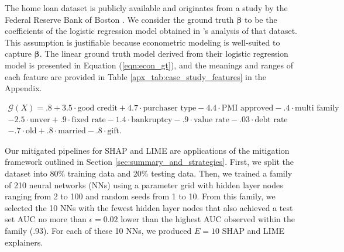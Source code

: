 \documentclass[12pt]{article}  %
\begin{document}
   The home loan dataset is publicly available and originates from a study by the Federal Reserve Bank of Boston \citep{hunter1996cultural}. We consider the ground truth $\boldsymbol{\beta}$ to be the coefficients of the logistic regression model obtained in \cite{bane2006econometric}'s analysis of that dataset. This assumption is justifiable because econometric modeling is well-suited to capture $\boldsymbol{\beta}$. The linear ground truth model derived from their logistic regression model is presented in Equation (\ref{eqn:econ_gt}), and the meanings and ranges of each feature are provided in Table \ref{apx_tab:case_study_features} in the Appendix.  %

    \begin{equation}
    \label{eqn:econ_gt}
    \begin{split}
        \mathcal{G}(X) =.8 + 3.5\cdot \text{good credit} + 4.7\cdot \text{purchaser type} -4.4 \cdot \text{PMI approved} - .4 \cdot \text{multi family} \\ -2.5 \cdot \text{unver} + .9 \cdot \text{fixed rate} - 1.4 \cdot \text{bankruptcy} - .9 \cdot \text{value rate} - .03 \cdot \text{debt rate} \\- .7 \cdot \text{old} + .8 \cdot \text{married} - .8 \cdot \text{gift}.
    \end{split}
    \end{equation}
    
Our mitigated pipelines for SHAP and LIME are applications of the mitigation framework outlined in Section \ref{sec:summary_and_strategies}. First, we split the dataset into 80\% training data and 20\% testing data. Then, we trained a family of 210 neural networks (NNs) using a parameter grid with hidden layer nodes ranging from 2 to 100 and random seeds from 1 to 10. From this family, we selected the 10 NNs with the fewest hidden layer nodes that also achieved a test set AUC no more than $\epsilon = 0.02$ lower than the highest AUC observed within the family (.93). For each of these 10 NNs, we produced $E = 10$ SHAP and LIME explainers.
\end{document}
